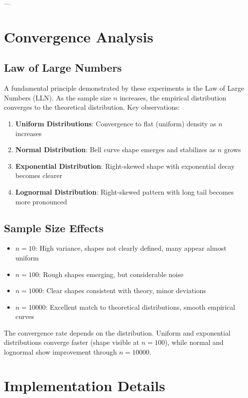 \documentclass[12pt]{article}
\begin{document}
---

\section{Convergence Analysis}

\subsection{Law of Large Numbers}

A fundamental principle demonstrated by these experiments is the Law of Large Numbers (LLN). As the sample size $n$ increases, the empirical distribution converges to the theoretical distribution. Key observations:

\begin{enumerate}
    \item \textbf{Uniform Distributions}: Convergence to flat (uniform) density as $n$ increases
    \item \textbf{Normal Distribution}: Bell curve shape emerges and stabilizes as $n$ grows
    \item \textbf{Exponential Distribution}: Right-skewed shape with exponential decay becomes clearer
    \item \textbf{Lognormal Distribution}: Right-skewed pattern with long tail becomes more pronounced
\end{enumerate}

\subsection{Sample Size Effects}

\begin{itemize}
    \item $n=10$: High variance, shapes not clearly defined, many appear almost uniform
    \item $n=100$: Rough shapes emerging, but considerable noise
    \item $n=1000$: Clear shapes consistent with theory, minor deviations
    \item $n=10000$: Excellent match to theoretical distributions, smooth empirical curves
\end{itemize}

The convergence rate depends on the distribution. Uniform and exponential distributions converge faster (shape visible at $n=100$), while normal and lognormal show improvement through $n=10000$.

\section{Implementation Details}
\end{document}
